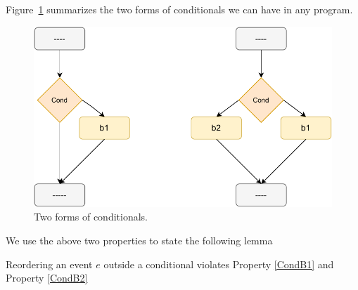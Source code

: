        Figure~\ref{reord:conditionals} summarizes the two forms of conditionals we can have in any program. 
        \begin{figure}[H]
            \centering 
            \includegraphics[scale=0.7]{4.InstructionReordering/5.ValidReorderingProgram/Conditionals2Form.pdf}
            \caption{Two forms of conditionals.}
            \label{reord:conditionals}
        \end{figure}


        We use the above two properties to state the following lemma 
        \begin{lemma}
            \label{CondBranchLemma}
            Reordering an event $e$ outside a conditional violates Property \ref{CondB1} and Property \ref{CondB2}
        \end{lemma}

